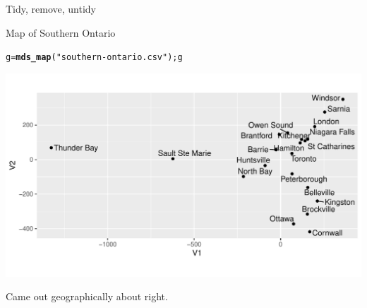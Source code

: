 \documentclass[unknownkeysallowed]{beamer}\usepackage[]{graphicx}\usepackage[]{color}
\makeatletter
\def\maxwidth{ %
  \ifdim\Gin@nat@width>\linewidth
    \linewidth
  \else
    \Gin@nat@width
  \fi
}
\newcommand{\hlstr}[1]{\textcolor[rgb]{0.192,0.494,0.8}{#1}}%
\newcommand{\hlstd}[1]{\textcolor[rgb]{0.345,0.345,0.345}{#1}}%
\newcommand{\hlkwb}[1]{\textcolor[rgb]{0.69,0.353,0.396}{#1}}%
\newcommand{\hlkwd}[1]{\textcolor[rgb]{0.737,0.353,0.396}{\textbf{#1}}}%
\newenvironment{kframe}{%
 \def\at@end@of@kframe{}%
 \ifinner\ifhmode%
  \def\at@end@of@kframe{\end{minipage}}%
  \begin{minipage}{\columnwidth}%
 \fi\fi%
 \def\FrameCommand##1{\hskip\@totalleftmargin \hskip-\fboxsep
 \colorbox{shadecolor}{##1}\hskip-\fboxsep
     \hskip-\linewidth \hskip-\@totalleftmargin \hskip\columnwidth}%
 \MakeFramed {\advance\hsize-\width
   \@totalleftmargin\z@ \linewidth\hsize
   \@setminipage}}%
 {\par\unskip\endMakeFramed%
 \at@end@of@kframe}
\newenvironment{knitrout}{}{} %
\makeatother
\begin{document}
\begin{frame}[fragile]{Tidy, remove, untidy}
\end{frame}

\begin{frame}[fragile]{Map of Southern Ontario}
  
\begin{knitrout}
\color{fgcolor}\begin{kframe}
\begin{alltt}
\hlstd{g} \hlkwb{=} \hlkwd{mds_map}\hlstd{(}\hlstr{"southern-ontario.csv"}\hlstd{) ; g}
\end{alltt}
\end{kframe}
\includegraphics[width=\maxwidth]{figure/unnamed-chunk-408-1} 

\end{knitrout}

Came out geographically about right.
  
\end{frame}
\end{document}
